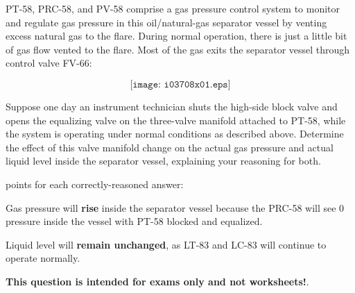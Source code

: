 

PT-58, PRC-58, and PV-58 comprise a gas pressure control system to monitor and regulate gas pressure in this oil/natural-gas separator vessel by venting excess natural gas to the flare.  During normal operation, there is just a little bit of gas flow vented to the flare.  Most of the gas exits the separator vessel through control valve FV-66:

$$\texttt{[image: i03708x01.eps]}$$

Suppose one day an instrument technician shuts the high-side block valve and opens the equalizing valve on the three-valve manifold attached to PT-58, while the system is operating under normal conditions as described above.  Determine the effect of this valve manifold change on the actual gas pressure and actual liquid level inside the separator vessel, explaining your reasoning for both.







 points for each correctly-reasoned answer:

\vskip 10pt

Gas pressure will {\bf rise} inside the separator vessel because the PRC-58 will see 0 pressure inside the vessel with PT-58 blocked and equalized.  

\vskip 10pt

Liquid level will {\bf remain unchanged}, as LT-83 and LC-83 will continue to operate normally.







{\bf This question is intended for exams only and not worksheets!}.



